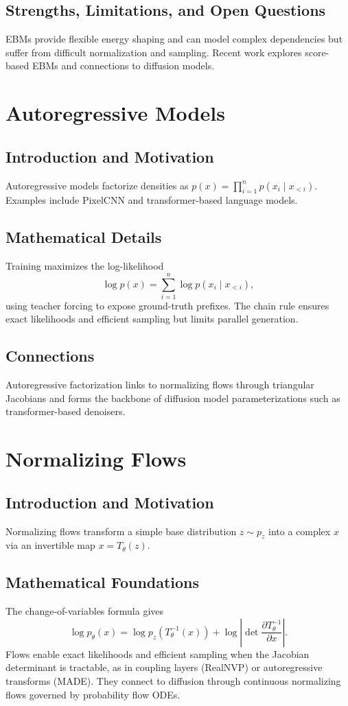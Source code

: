 \subsection{Strengths, Limitations, and Open Questions}
EBMs provide flexible energy shaping and can model complex dependencies but suffer from difficult normalization and sampling. Recent work explores score-based EBMs and connections to diffusion models.

\section{Autoregressive Models}
\subsection{Introduction and Motivation}
Autoregressive models factorize densities as $p(x)=\prod_{i=1}^n p(x_i\mid x_{<i})$. Examples include PixelCNN and transformer-based language models.
\subsection{Mathematical Details}
Training maximizes the log-likelihood
\begin{equation}
\log p(x)=\sum_{i=1}^n \log p(x_i\mid x_{<i}),
\end{equation}
using teacher forcing to expose ground-truth prefixes. The chain rule ensures exact likelihoods and efficient sampling but limits parallel generation.
\subsection{Connections}
Autoregressive factorization links to normalizing flows through triangular Jacobians and forms the backbone of diffusion model parameterizations such as transformer-based denoisers.

\section{Normalizing Flows}
\subsection{Introduction and Motivation}
Normalizing flows \cite{rezende2015} transform a simple base distribution $z\sim p_z$ into a complex $x$ via an invertible map $x=T_\theta(z)$.
\subsection{Mathematical Foundations}
The change-of-variables formula gives
\begin{equation}
\log p_\theta(x)=\log p_z(T_\theta^{-1}(x)) + \log\left|\det \frac{\partial T_\theta^{-1}}{\partial x}\right|.
\end{equation}
Flows enable exact likelihoods and efficient sampling when the Jacobian determinant is tractable, as in coupling layers (RealNVP) or autoregressive transforms (MADE). They connect to diffusion through continuous normalizing flows governed by probability flow ODEs.

